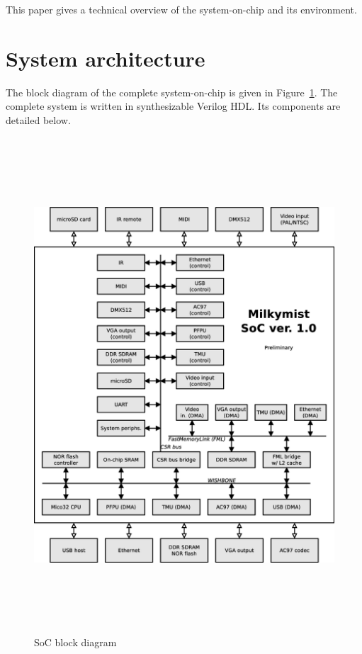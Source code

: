 \documentclass[a4paper,11pt,twocolumn]{paper}
\begin{document}
This paper gives a technical overview of the system-on-chip and its environment.

\section{System architecture}
The block diagram of the complete system-on-chip is given in Figure~\ref{fig:block}. The complete system is written in synthesizable Verilog HDL. Its components are detailed below.
\begin{figure}
\centering
\includegraphics[height=185mm]{soc_architecture.eps}
\caption{SoC block diagram}
\label{fig:block}
\end{figure}
\end{document}

